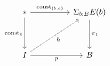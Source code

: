 \[\begin{tikzcd}
	{*} && {\Sigma_{b : B} E(b)} \\
	\\
	I && B
	\arrow["p"', from=3-1, to=3-3]
	\arrow["{\text{const}_{(b, e)}}", from=1-1, to=1-3]
	\arrow["{\text{const}_{0}}"', from=1-1, to=3-1]
	\arrow["{\pi_1}", from=1-3, to=3-3]
	\arrow["h"', dashed, from=3-1, to=1-3]
\end{tikzcd}\]